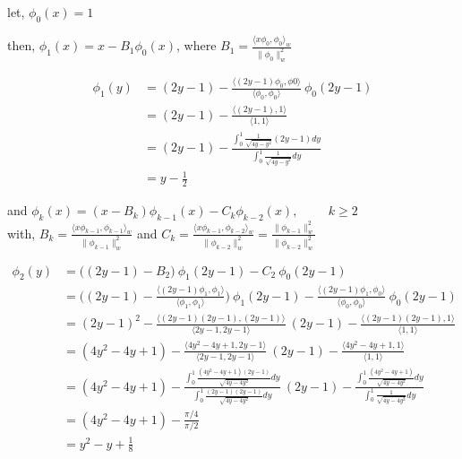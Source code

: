 \documentclass[a4paper,11pt]{report}
\begin{document}
\begin{enumerate}
    let, $\phi_{0}(x) = 1$

    then, $\phi_{1}(x) = x - B_{1} \phi_{0}(x)$, where $B_{1} = \displaystyle \frac{\langle x \phi_{0}, \phi_{0} \rangle_{w}}{\| \phi_{0} \|_{w}^{2}}$
    
    \begin{equation*}
    \begin{aligned}
    \phi_{1}(y) &= (2y-1) - \displaystyle \frac{\langle (2y-1) \phi_{0}, \phi{0} \rangle}{\langle \phi_{0}, \phi_{0} \rangle}\ \phi_{0}(2y-1) \\
                &= (2y-1) - \displaystyle \frac{\langle (2y-1), 1 \rangle}{\langle 1, 1 \rangle} \\
                &= (2y-1) - \displaystyle \frac{\displaystyle\int_{0}^{1} \frac{1}{\sqrt{4y-y^2}} (2y-1) dy}{\displaystyle\int_{0}^{1} \frac{1}{\sqrt{4y-y^2}} dy} \\
                &= y - \frac{1}{2}
    \end{aligned}
    \end{equation*}

    and $\phi_{k}(x) = (x - B_{k}) \phi_{k-1}(x) - C_{k} \phi_{k-2}(x), \hspace{1cm} k \ge 2$ \\
    with, $B_{k} = \displaystyle \frac{\langle x \phi_{k-1}, \phi_{k-1} \rangle_{w}}{\| \phi_{k-1} \|_{w}^{2}}$ and
    $C_{k} = \displaystyle \frac{\langle x \phi_{k-1}, \phi_{k-2} \rangle_{w}}{\| \phi_{k-2} \|_{w}^{2}} = \frac{\| \phi_{k-1} \|_{w}^{2}}{\| \phi_{k-2} \|_{w}^{2}}$

    \begin{equation*}
    \begin{aligned}
    \phi_{2}(y) &= \big((2y-1) - B_{2}\big)\ \phi_{1}(2y-1) - C_{2}\ \phi_{0}(2y-1) \\
                &= \bigg((2y-1) - \frac{\langle (2y-1) \phi_{1}, \phi_{1} \rangle}{\langle \phi_{1}, \phi_{1} \rangle}\bigg)\ \phi_{1}(2y-1) - \frac{\langle (2y-1) \phi_{1}, \phi_{0} \rangle}{\langle \phi_{0}, \phi_{0} \rangle}\ \phi_{0}(2y-1) \\
                &= (2y-1)^2 - \frac{\langle (2y-1)(2y-1), (2y-1) \rangle}{\langle 2y-1, 2y-1 \rangle}\ (2y-1) - \frac{\langle (2y-1)(2y-1), 1 \rangle}{\langle 1, 1 \rangle} \\
                &= (4y^2 - 4y + 1) - \frac{\langle 4y^2 - 4y + 1, 2y-1 \rangle}{\langle 2y-1, 2y-1 \rangle}\ (2y-1) - \frac{\langle 4y^2 - 4y + 1, 1 \rangle}{\langle 1, 1 \rangle} \\
                &= (4y^2 - 4y + 1) - \frac{\displaystyle \int_{0}^{1} \frac{(4y^2 - 4y + 1)(2y-1)}{\sqrt{4y-4y^2}} dy}{\displaystyle \int_{0}^{1} \frac{(2y-1)(2y-1)}{\sqrt{4y-4y^2}} dy}\ (2y-1) - \frac{\displaystyle \int_{0}^{1} \frac{(4y^2 - 4y + 1)}{\sqrt{4y-4y^2}} dy}{\displaystyle \int_{0}^{1} \frac{1}{\sqrt{4y-4y^2}} dy} \\
                &= (4y^2 - 4y + 1) - \displaystyle \frac{\pi/4}{\pi/2} \\
                &= y^2 - y + \frac{1}{8}
    \end{aligned}
    \end{equation*}
    

\end{enumerate}
\end{document}
